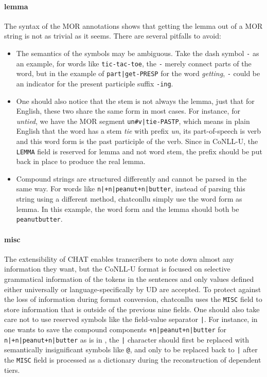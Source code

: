 \paragraph{lemma} The syntax of the MOR annotations shows that getting the lemma out of a MOR string is not as trivial as it seems. There are several pitfalls to avoid:
\begin{itemize}
	\item The semantics of the symbols may be ambiguous. Take the dash symbol \texttt{-} as an example, for words like \texttt{tic-tac-toe}, the \texttt{-} merely connect parts of the word, but in the example of \texttt{part|get-PRESP} for the word \emph{getting}, \texttt{-} could be an indicator for the present participle suffix \texttt{-ing}.
	\item One should also notice that the stem is not always the lemma, just that for English, these two share the same form in most cases. For instance, for \emph{untied}, we have the MOR segment \texttt{un\#v|tie-PASTP}, which means in plain English that the word has a stem \emph{tie} with prefix \emph{un}, its part-of-speech is verb and this word form is the past participle of the verb. Since in CoNLL-U, the \texttt{LEMMA} field is reserved for lemma and not word stem, the prefix should be put back in place to produce the real lemma.
	\item Compound strings are structured differently and cannot be parsed in the same way. For words like \texttt{n|+n|peanut+n|butter}, instead of parsing this string using a different method, chatconllu simply use the word form as lemma. In this example, the word form and the lemma should both be \texttt{peanutbutter}.
\end{itemize}

\paragraph{misc}
The extensibility of CHAT enables transcribers to note down almost any information they want, but the CoNLL-U format is focused on selective grammatical information of the tokens in the sentences and only values defined either universally or language-specifically by UD are accepted. To protect against the loss of information during format conversion, chatconllu uses the \texttt{MISC} field to store information that is outside of the previous nine fields.
One should also take care not to use reserved symbols like the field-value separator \texttt{|}. For instance, in one wants to save the compound components \texttt{+n|peanut+n|butter} for \texttt{n|+n|peanut+n|butter} as is in , the \texttt{|} character should first be replaced with semantically insignificant symbols like \texttt{@}, and only to be replaced back to \texttt{|} after the \texttt{MISC} field is processed as a dictionary during the reconstruction of dependent tiers.\\
\vspace{-1.5em}
